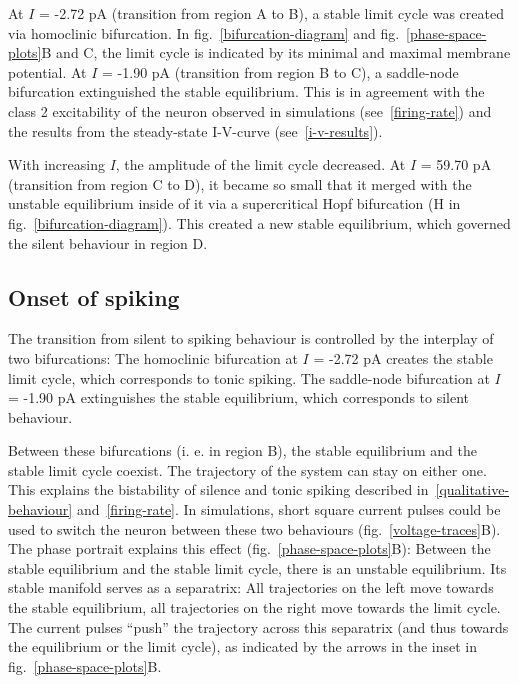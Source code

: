 \documentclass[12pt,a4paper,]{report}
\begin{document}
At $I$ = -2.72 pA (transition from region A to B), a stable limit cycle
was created via homoclinic bifurcation. In
fig.~\ref{bifurcation-diagram} and fig.~\ref{phase-space-plots}B and C,
the limit cycle is indicated by its minimal and maximal membrane
potential. At $I$ = -1.90 pA (transition from region B to C), a
saddle-node bifurcation extinguished the stable equilibrium. This is in
agreement with the class 2 excitability of the neuron observed in
simulations (see~\ref{firing-rate}) and the results from the
steady-state I-V-curve (see~\ref{i-v-results}).

With increasing $I$, the amplitude of the limit cycle decreased. At $I$
= 59.70 pA (transition from region C to D), it became so small that it
merged with the unstable equilibrium inside of it via a supercritical
Hopf bifurcation (H in fig.~\ref{bifurcation-diagram}). This created a
new stable equilibrium, which governed the silent behaviour in region D.

\subsection{Onset of spiking}\label{onset-of-spiking}

The transition from silent to spiking behaviour is controlled by the
interplay of two bifurcations: The homoclinic bifurcation at $I$ = -2.72
pA creates the stable limit cycle, which corresponds to tonic spiking.
The saddle-node bifurcation at $I$ = -1.90 pA extinguishes the stable
equilibrium, which corresponds to silent behaviour.

Between these bifurcations (i. e. in region B), the stable equilibrium
and the stable limit cycle coexist. The trajectory of the system can
stay on either one. This explains the bistability of silence and tonic
spiking described in~\ref{qualitative-behaviour} and~\ref{firing-rate}.
In simulations, short square current pulses could be used to switch the
neuron between these two behaviours (fig.~\ref{voltage-traces}B). The
phase portrait explains this effect (fig.~\ref{phase-space-plots}B):
Between the stable equilibrium and the stable limit cycle, there is an
unstable equilibrium. Its stable manifold serves as a separatrix: All
trajectories on the left move towards the stable equilibrium, all
trajectories on the right move towards the limit cycle. The current
pulses ``push'' the trajectory across this separatrix (and thus towards
the equilibrium or the limit cycle), as indicated by the arrows in the
inset in fig.~\ref{phase-space-plots}B.
\end{document}
